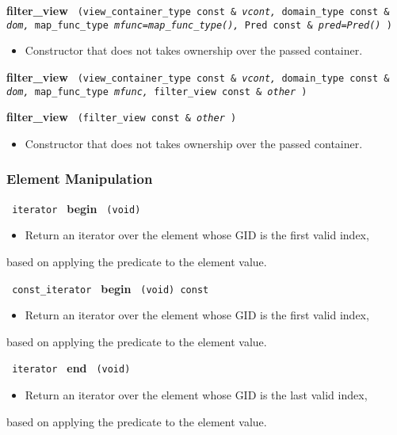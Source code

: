 \noindent
\textbf{filter\_view}%
\texttt{%
(view\_container\_type const \&
\textit{vcont,}%
domain\_type const \&
\textit{dom,}%
map\_func\_type
\textit{mfunc=map\_func\_type(),}%
Pred const \&
\textit{pred=Pred()}%
)
}

\begin{itemize}
\item
Constructor that does not takes ownership over the passed container.
\end{itemize}

\noindent
\textbf{filter\_view}%
\texttt{%
(view\_container\_type const \&
\textit{vcont,}%
domain\_type const \&
\textit{dom,}%
map\_func\_type
\textit{mfunc,}%
filter\_view const \&
\textit{other}%
)
}

\noindent
\textbf{filter\_view}%
\texttt{%
(filter\_view const \&
\textit{other}%
)
}

\begin{itemize}
\item
Constructor that does not takes ownership over the passed container.
\end{itemize}

\subsubsection{ Element Manipulation}

\noindent
\texttt{%
iterator
}
\newline
\textbf{begin}%
\texttt{%
(void)
}

\begin{itemize}
\item
Return an iterator over the element whose GID is the first valid index,
\end{itemize}
based on applying the predicate to the element value.

\noindent
\texttt{%
const\_iterator
}
\newline
\textbf{begin}%
\texttt{%
(void) const
}

\begin{itemize}
\item
Return an iterator over the element whose GID is the first valid index,
\end{itemize}
based on applying the predicate to the element value.

\noindent
\texttt{%
iterator
}
\newline
\textbf{end}%
\texttt{%
(void)
}

\begin{itemize}
\item
Return an iterator over the element whose GID is the last valid index,
\end{itemize}
based on applying the predicate to the element value.

